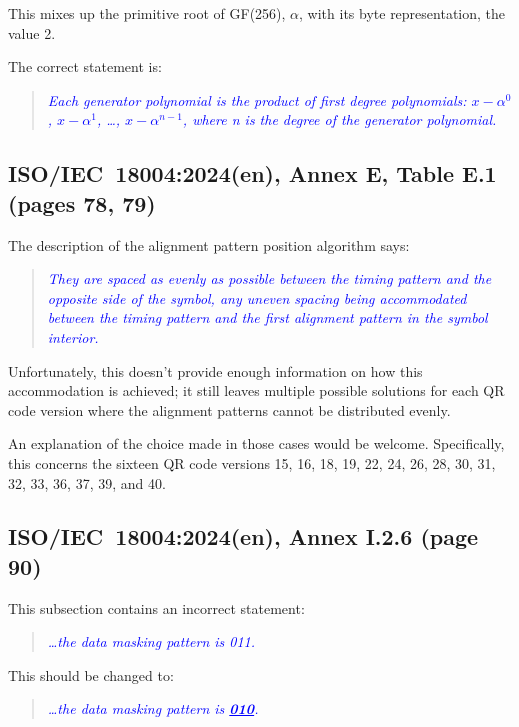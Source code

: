 \documentclass[a4paper,twoside]{article}
\newcommand{\shortstandard}{ISO/IEC~18004}
\newcommand{\standard}{\shortstandard:2024(en)}
\newcommand{\quotestandard}[1]{\textcolor{blue}{\textit{#1}}}
\newcommand{\ddd}{\dots}
\newcommand{\change}[1]{\underline{\textbf{#1}}}
\begin{document}
This mixes up the primitive root of GF(256), $\alpha$, with its byte representation, the value 2.

The correct statement is:

\begin{quote}
\quotestandard{Each generator polynomial is the product of first degree polynomials: \change{$x - \alpha^0$}, \change{$x - \alpha^1$}, \dots, \change{$x - \alpha^{n-1}$},
where n is the degree of the generator polynomial.}
\end{quote}

\subsection{\standard, Annex E, Table E.1 (pages 78, 79)}

The description of the alignment pattern position algorithm says:

\begin{quote}
\quotestandard{They are spaced as evenly as possible between the timing pattern and the opposite side of the symbol, any uneven
spacing being accommodated between the timing pattern and the first alignment pattern in the symbol interior.}
\end{quote}

Unfortunately, this doesn't provide enough information on how this accommodation is achieved; it still leaves multiple
possible solutions for each QR code version where the alignment patterns cannot be distributed evenly.

An explanation  of the choice made in those cases would be welcome. Specifically, this concerns the sixteen QR code versions
15, 16, 18, 19, 22, 24, 26, 28, 30, 31, 32, 33, 36, 37, 39, and 40.

\subsection{\standard, Annex I.2.6 (page 90)}
\label{sec:dmp-changed-2}

This subsection contains an incorrect statement:

\begin{quote}
\quotestandard{\ddd the data masking pattern is 011.}
\end{quote}

This should be changed to:

\begin{quote}
\quotestandard{\ddd the data masking pattern is \change{010}.}
\end{quote}
\end{document}
